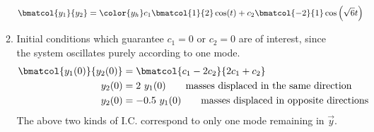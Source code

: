 \begin{enumerate}
\begin{enumerate}
\begin{align}
                        \bmatcol{y_1}{y_2}                                                  &
                        = \color{y_h} c_1 \bmatcol{1}{2}\cos(t)
                        + c_2 \bmatcol{-2}{1}\cos\left( \sqrt{6}t \right)
                    \end{align}
              \item Initial conditions which guarantee $ c_1 = 0 $ or $ c_2  = 0$ are
                    of interest, since the system oscillates purely according to one mode.
                    \begin{align}
                        \bmatcol{y_1(0)}{y_2(0)} & = \bmatcol{c_1 - 2c_2}{2c_1 + c_2}                                   \\
                        y_2(0)                   & = 2\ y_1(0) \qquad \text{masses displaced in the same direction}     \\
                        y_2(0)                   & = -0.5\ y_1(0) \qquad \text{masses displaced in opposite directions}
                    \end{align}
                    The above two kinds of I.C. correspond to only one mode remaining in $ \vec{y} $.
          \end{enumerate}


\end{enumerate}
